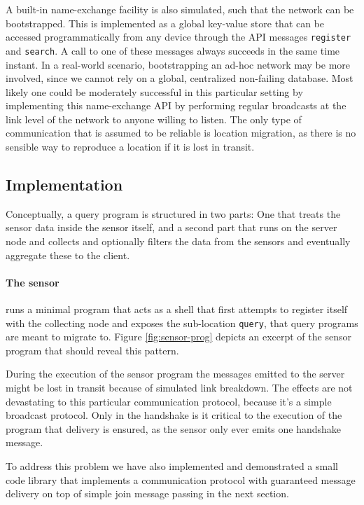 A built-in name-exchange facility is also simulated, such that the network can
be bootstrapped. This is implemented as a global key-value store that can be
accessed programmatically from any device through the API messages
\verb!register! and \verb!search!. A call to one of these messages always
succeeds in the same time instant. In a real-world scenario, bootstrapping an
ad-hoc network may be more involved, since we cannot rely on a global,
centralized non-failing database.  Most likely one could be moderately
successful in this particular setting by implementing this name-exchange API by
performing regular broadcasts at the link level of the network to anyone willing
to listen.
The only type of communication that is assumed to be reliable is location
migration, as there is no sensible way to reproduce a location if it is lost
in transit.

\subsection*{Implementation}

Conceptually, a query program is structured in two parts: One that treats the
sensor data inside the sensor itself, and a second part that runs on the server
node and collects and optionally filters the data from the sensors and
eventually aggregate these to the client.

\paragraph{The sensor} runs a minimal program that acts as a shell that first
attempts to register itself with the collecting node and exposes the
sub-location \texttt{query}, that query programs are meant to migrate to.
Figure \ref{fig:sensor-prog} depicts an excerpt of the sensor program that
should reveal this pattern.

During the execution of the sensor program the messages emitted to the server
might be lost in transit because of simulated link breakdown. The effects are
not devastating to this particular communication protocol, because it's a
simple broadcast protocol.  Only in the handshake is it critical to the
execution of the program that delivery is ensured, as the sensor only ever
emits one handshake message.

To address this problem we have also implemented and demonstrated a small code
library that implements a communication protocol with guaranteed message
delivery on top of simple join message passing in the next section.

